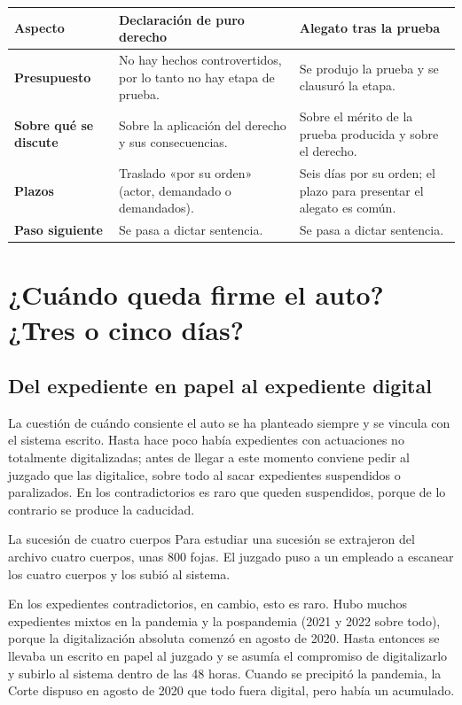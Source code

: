 \documentclass[12pt,oneside]{book}
\begin{document}
\begin{table}[H]
\centering
\small
\begin{tabularx}{\textwidth}{L{0.20\textwidth} Y Y}
\toprule
\textbf{Aspecto} & \textbf{Declaración de puro derecho} & \textbf{Alegato tras la prueba} \\
\midrule
\textbf{Presupuesto} & No hay hechos controvertidos, por lo tanto no hay etapa de prueba. & Se produjo la prueba y se clausuró la etapa. \\
\textbf{Sobre qué se discute} & Sobre la aplicación del derecho y sus consecuencias. & Sobre el mérito de la prueba producida y sobre el derecho. \\
\textbf{Plazos} & Traslado «por su orden» (actor, demandado o demandados). & Seis días por su orden; el plazo para presentar el alegato es común. \\
\textbf{Paso siguiente} & Se pasa a dictar sentencia. & Se pasa a dictar sentencia. \\
\bottomrule
\end{tabularx}
\end{table}

\section{¿Cuándo queda firme el auto? ¿Tres o cinco días?}

\subsection{Del expediente en papel al expediente digital}

La cuestión de cuándo consiente el auto se ha planteado siempre y se vincula con el sistema escrito. Hasta hace poco había expedientes con actuaciones no totalmente digitalizadas; antes de llegar a este momento conviene pedir al juzgado que las digitalice, sobre todo al sacar expedientes suspendidos o paralizados. En los contradictorios es raro que queden suspendidos, porque de lo contrario se produce la caducidad.

\begin{example}{La sucesión de cuatro cuerpos}
Para estudiar una sucesión se extrajeron del archivo cuatro cuerpos, unas 800 fojas. El juzgado puso a un empleado a escanear los cuatro cuerpos y los subió al sistema.
\end{example}

En los expedientes contradictorios, en cambio, esto es raro. Hubo muchos expedientes mixtos en la pandemia y la pospandemia (2021 y 2022 sobre todo), porque la digitalización absoluta comenzó en agosto de 2020. Hasta entonces se llevaba un escrito en papel al juzgado y se asumía el compromiso de digitalizarlo y subirlo al sistema dentro de las 48 horas. Cuando se precipitó la pandemia, la Corte dispuso en agosto de 2020 que todo fuera digital, pero había un acumulado.
\end{document}
